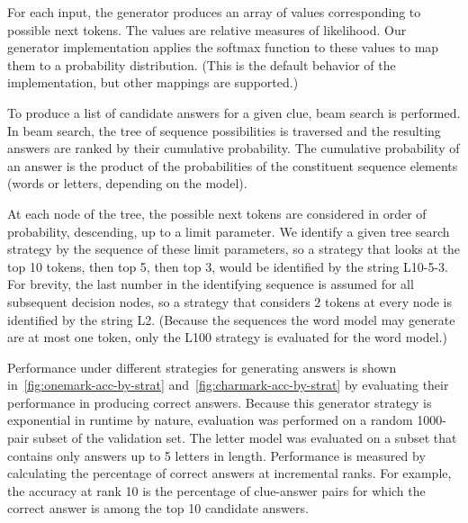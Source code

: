 \documentclass[letterpaper]{article} %
\begin{document}
\begin{NoHyper}
For each input, the generator produces an array of values corresponding to possible next tokens. The values are relative measures of likelihood. Our generator implementation applies the softmax function to these values to map them to a probability distribution. (This is the default behavior of the implementation, but other mappings are supported.)

To produce a list of candidate answers for a given clue, beam search is performed. In beam search, the tree of sequence possibilities is traversed and the resulting answers are ranked by their cumulative probability. The cumulative probability of an answer is the product of the probabilities of the constituent sequence elements (words or letters, depending on the model).

At each node of the tree, the possible next tokens are considered in order of probability, descending, up to a limit parameter.
We identify a given tree search strategy by the sequence of these limit parameters, so a strategy that looks at the top 10 tokens, then top 5, then top 3, would be identified by the string L10-5-3.
For brevity, the last number in the identifying sequence is assumed for all subsequent decision nodes, so a strategy that considers 2 tokens at every node is identified by the string L2. (Because the sequences the word model may generate are at most one token, only the L100 strategy is evaluated for the word model.)

Performance under different strategies for generating answers is shown in~\ref{fig:onemark-acc-by-strat} and~\ref{fig:charmark-acc-by-strat} by evaluating their performance in producing correct answers.
Because this generator strategy is exponential in runtime by nature, evaluation was performed on a random 1000-pair subset of the validation set.
The letter model was evaluated on a subset that contains only answers up to 5 letters in length.
Performance is measured by calculating the percentage of correct answers at incremental ranks.
For example, the accuracy at rank 10 is the percentage of clue-answer pairs for which the correct answer is among the top 10 candidate answers.


\end{NoHyper}
\end{document}

